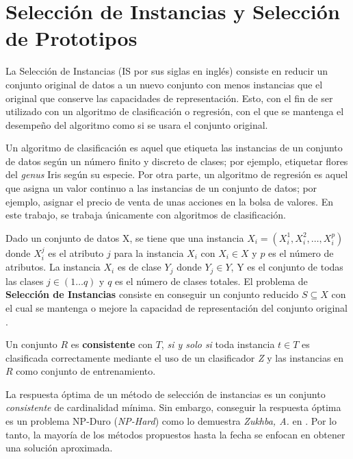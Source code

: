 \section{Selección de Instancias y Selección de Prototipos}

La Selección de Instancias \cite{garcia2016data} (IS por sus siglas en inglés) consiste en reducir un conjunto original de datos a un nuevo conjunto con menos instancias que el original que conserve las capacidades de representación. Esto, con el fin de ser utilizado con un algoritmo de clasificación o regresión, con el que se mantenga el desempeño del algoritmo como si se usara el conjunto original.

Un algoritmo de clasificación \cite{hand2007principles} es aquel que etiqueta las instancias de un conjunto de datos según un número finito y discreto de clases; por ejemplo, etiquetar flores del \emph{genus} Iris según su especie. Por otra parte, un algoritmo de regresión \cite{hand2007principles} es aquel que asigna un valor continuo a las instancias de un conjunto de datos; por ejemplo, asignar el precio de venta de unas acciones en la bolsa de valores. En este trabajo, se trabaja únicamente con algoritmos de clasificación. \\

\begin{definicion}
Dado un conjunto de datos X, se tiene que una instancia $X_i = (X_i^1,X_i^2,\dots,X_i^p)$ donde $X_i^j$ es el atributo $j$ para la instancia $X_i$ con $X_i\in X$ y $p$ es el número de atributos. La instancia $X_i$ es de clase $Y_j$ donde $Y_j\in Y$, Y es el conjunto de todas las clases $j\in (1\dots q)$ y $q$ es el número de clases totales. El problema de \textbf{Selección de Instancias} consiste en conseguir un conjunto reducido $S\subseteq X$ con el cual se mantenga o mejore la capacidad de representación del conjunto original \cite{garcia2016data}.\\
\end{definicion}


\begin{definicion}
Un conjunto $R$ es \textbf{consistente} con $T$, \emph{si y solo si} toda instancia $t \in T$ es clasificada correctamente mediante el uso de un clasificador \emph{Z} y las instancias en $R$ como conjunto de entrenamiento. \cite{flores2014metaheuristics}
\end{definicion}

La respuesta óptima de un método de selección de instancias es un conjunto \emph{consistente} de cardinalidad mínima. Sin embargo, conseguir la respuesta óptima es un problema NP-Duro (\emph{NP-Hard}) como lo demuestra \emph{Zukhba, A.} en \cite{zukhba2010np}. Por lo tanto, la mayoría de los métodos propuestos hasta la fecha se enfocan en obtener una solución aproximada.

